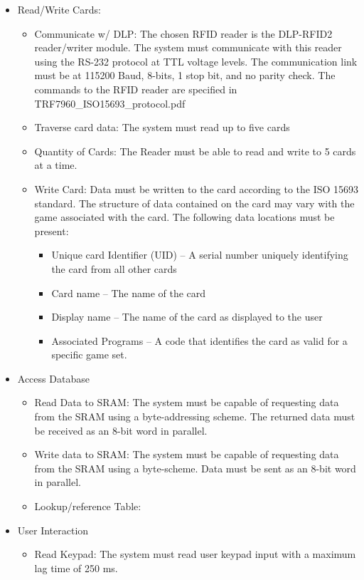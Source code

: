 \documentclass[12pt]{article} %
\begin{document}
\begin{itemize}
	\item Read/Write Cards: 
		\begin{itemize}
			\item Communicate w/ DLP: The chosen RFID reader is the DLP-RFID2 reader/writer module. The system must communicate with this reader using the RS-232 protocol at TTL voltage levels. The communication link must be at 115200 Baud, 8-bits, 1 stop bit, and no parity check. The commands to the RFID reader are specified in TRF7960_ISO15693_protocol.pdf 
			\item Traverse card data: The system must read up to five cards
			\item Quantity of Cards: The Reader must be able to read and write to 5 cards at a time.
			\item Write Card: Data must be written to the card according to the ISO 15693 standard. The structure of data contained on the card may vary with the game associated with the card. The following data locations must be present:
				\begin{itemize}
					\item Unique card Identifier (UID) – A serial number uniquely identifying the card from all other cards
					\item Card name – The name of the card
					\item Display name – The name of the card as displayed to the user
					\item Associated Programs – A code that identifies the card as valid for a specific game set.
				\end{itemize}
			\end{itemize}
	\item Access Database
		\begin{itemize}
			\item Read Data to SRAM: The system must be capable of requesting data from the SRAM using a byte-addressing scheme. The returned data must be received as an 8-bit word in parallel.
			\item Write data to SRAM: The system must be capable of requesting data from the SRAM using a byte-scheme. Data must be sent as an 8-bit word in parallel.
			\item Lookup/reference Table:
		\end{itemize}
	\item User Interaction
		\begin{itemize}
			\item Read Keypad: The system must read user keypad input with a maximum lag time of 250 ms.  

\end{itemize}
\end{itemize}
\end{document}
